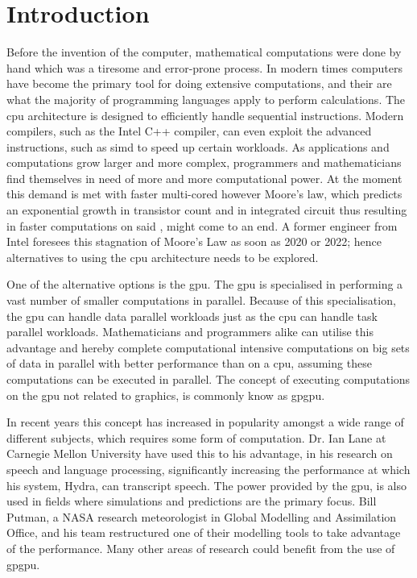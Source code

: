 \chapter{Introduction} %
\label{cha:introduction}
Before the invention of the computer, mathematical computations were done by hand which was a tiresome and error-prone process.
In modern times computers have become the primary tool for doing extensive computations, and their  are what the majority of programming languages apply to perform calculations.
The \acrshort{cpu} architecture is designed to efficiently handle sequential instructions. 
Modern compilers, such as the Intel C++ compiler, can even exploit the   advanced instructions, such as \acrfull{simd} to speed up certain workloads. \citep{INTEL_SIMD}
As applications and computations grow larger and more complex, programmers and mathematicians find themselves in need of more and more computational power. \citep[pp. 4]{OpenCL_AMD}
At the moment this demand is met with faster multi-cored  however Moore's law, which predicts an exponential growth in transistor count and in integrated circuit thus resulting in faster computations on said , might come to an end.
A former engineer from Intel foresees this stagnation of Moore's Law as soon as 2020 or 2022; hence alternatives to using the \acrshort{cpu} architecture needs to be explored.\citep{Moore2013} 

One of the alternative options is the \acrfull{gpu}.
The \acrshort{gpu} is specialised in performing a vast number of smaller computations in parallel.
Because of this specialisation, the \acrshort{gpu} can handle data parallel workloads just as the \acrshort{cpu} can handle task parallel workloads.
Mathematicians and programmers alike can utilise this advantage and hereby complete computational intensive computations on big sets of data in parallel with better performance than on a \acrshort{cpu}, assuming these computations can be executed in parallel.
The concept of executing computations on the \acrshort{gpu} not related to graphics, is commonly know as \acrfull{gpgpu}.

In recent years this concept has increased in popularity amongst a wide range of different subjects, which requires some form of computation. 
Dr. Ian Lane at Carnegie Mellon University have used this to his advantage, in his research on speech and language processing, significantly increasing the performance at which his system, Hydra, can transcript speech. \citep{NvidiaSpotlightIan}
The power provided by the \acrshort{gpu}, is also used in fields where simulations and predictions are the primary focus. 
Bill Putman, a NASA research meteorologist in Global Modelling and Assimilation Office, and his team restructured one of their modelling tools to take advantage of the  performance. \citep{NvidiaSpotlightNasa}
Many other areas of research could benefit from the use of \acrshort{gpgpu}.

